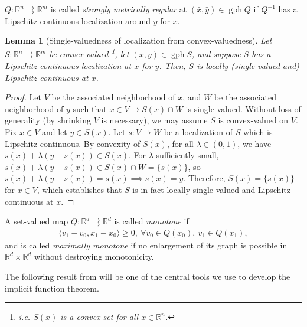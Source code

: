 \documentclass[reqno]{amsart}
\newtheorem{lemma}[proposition]{Lemma}
\numberwithin{equation}{section}
\newcommand{\R}{\mathbb{R}}
\newcommand{\x}{\bar{x}}
\newcommand{\gph}{\operatorname{gph}}
\begin{document}
$Q : \R^n \rightrightarrows \R^m$ is called \emph{strongly metrically regular} at $(\bar{x}, \bar{y}) \in \gph Q$ if $Q^{-1}$ has a Lipschitz continuous localization around $\bar{y}$ for $\bar{x}$.

\begin{lemma}[Single-valuedness of localization from convex-valuedness]\label{lem:localizationAndConvexity}
    Let $S : \R^n \rightrightarrows \R^m$ be convex-valued \footnote{i.e. $S(x)$ is a convex set for all $x \in \R^n$.}, let $(\bar x, \bar y) \in \gph S$, and suppose $S$ has a Lipschitz continuous localization at $\bar x$ for $\bar y$.
    Then, $S$ is locally (single-valued and) Lipschitz continuous at $\bar x$.
\end{lemma}

\begin{proof}
    Let $V$ be the associated neighborhood of $\x$, and $W$ be the associated neighborhood of $\bar y$ such that $x \in V \mapsto S(x) \cap W$ is single-valued. Without loss of generality (by shrinking $V$ is necessary), we may assume $S$ is convex-valued on $V$. Fix $x \in V$ and let $y \in S(x)$. Let $s : V \to W$ be a localization of $S$ which is Lipschitz continuous.  By convexity of $S(x)$, for all $\lambda \in (0, 1)$, we have $s(x) + \lambda(y - s(x)) \in S(x)$. For $\lambda$ sufficiently small, $s(x) + \lambda(y - s(x)) \in S(x) \cap W = \{s(x)\}$, so $s(x) + \lambda(y - s(x)) = s(x) \implies s(x) = y$. Therefore, $S(x) = \{s(x)\}$ for $x \in V$, which establishes that $S$ is in fact locally single-valued and Lipschitz continuous at $\bar x$.
\end{proof}

A set-valued map $Q : \R^d \rightrightarrows \R^d$ is called \emph{monotone} if \begin{align*}
    \langle v_1 - v_0, x_1 - x_0 \rangle \ge 0, \ \forall v_0 \in Q(x_0), \ v_1 \in Q(x_1),
\end{align*} and is called \emph{maximally monotone} if no enlargement of its graph is possible in $\R^d \times \R^d$ without destroying monotonicity.

 The following result from \cite[Theorem 3G.5]{DoR 14} will be one of the central tools we use to develop the implicit function theorem.
\end{document}
